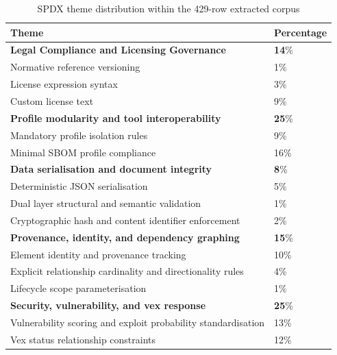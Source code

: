 \begin{table}[htbp]
\caption{SPDX theme distribution within the 429-row extracted corpus}
\label{tab:spdx_theme_distribution}
\centering
\footnotesize
\begin{tabular}{@{}ll@{}}
\toprule
\textbf{Theme} & \textbf{Percentage} \\
\midrule

\textbf{Legal Compliance and Licensing Governance} & \textbf{14}\% \\
\hspace{1.5em}Normative reference versioning & 1\% \\
\hspace{1.5em}License expression syntax & 3\% \\
\hspace{1.5em}Custom license text & 9\% \\

\textbf{Profile modularity and tool interoperability} & \textbf{25}\% \\
\hspace{1.5em}Mandatory profile isolation rules & 9\% \\
\hspace{1.5em}Minimal SBOM profile compliance & 16\% \\

\textbf{Data serialisation and document integrity} & \textbf{8}\% \\
\hspace{1.5em}Deterministic JSON serialisation & 5\% \\
\hspace{1.5em}Dual layer structural and semantic validation & 1\% \\
\hspace{1.5em}Cryptographic hash and content identifier enforcement & 2\% \\

\textbf{Provenance, identity, and dependency graphing} & \textbf{15}\% \\
\hspace{1.5em}Element identity and provenance tracking & 10\% \\
\hspace{1.5em}Explicit relationship cardinality and directionality rules & 4\% \\
\hspace{1.5em}Lifecycle scope parameterisation & 1\% \\

\textbf{Security, vulnerability, and vex response} & \textbf{25}\% \\
\hspace{1.5em}Vulnerability scoring and exploit probability standardisation & 13\% \\
\hspace{1.5em}Vex status relationship constraints & 12\% \\


\end{tabular}
\end{table}
